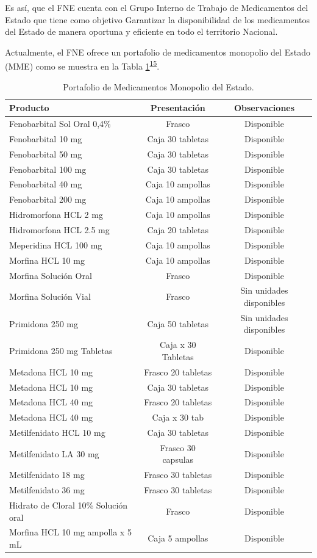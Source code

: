 \documentclass[
]{book}
\begin{document}
Es así, que el FNE cuenta con el Grupo Interno de Trabajo de Medicamentos del Estado que tiene como objetivo Garantizar la disponibilidad de los medicamentos del Estado de manera oportuna y eficiente en todo el territorio Nacional.

Actualmente, el FNE ofrece un portafolio de medicamentos monopolio del Estado (MME) como se muestra en la Tabla \ref{tab:portafolioMME}\textsuperscript{\protect\hyperlink{ref-ColombiaCompraEficiente2021}{15}}.

\begin{table}

\caption{\label{tab:portafolioMME}Portafolio de Medicamentos Monopolio del Estado.}
\centering
\begin{tabular}[t]{lcc}
\toprule
Producto & Presentación & Observaciones\\
\midrule
Fenobarbital Sol Oral 0,4\% & Frasco & Disponible\\
Fenobarbital 10 mg & Caja 30 tabletas & Disponible\\
Fenobarbital 50 mg & Caja 30 tabletas & Disponible\\
Fenobarbital 100 mg & Caja 30 tabletas & Disponible\\
Fenobarbital 40 mg & Caja 10 ampollas & Disponible\\
\addlinespace
Fenobarbital 200 mg & Caja 10 ampollas & Disponible\\
Hidromorfona HCL 2 mg & Caja 10 ampollas & Disponible\\
Hidromorfona HCL 2.5 mg & Caja 20 tabletas & Disponible\\
Meperidina HCL 100 mg & Caja 10 ampollas & Disponible\\
Morfina HCL 10 mg & Caja 10 ampollas & Disponible\\
\addlinespace
Morfina Solución Oral & Frasco & Disponible\\
Morfina Solución Vial & Frasco & Sin unidades disponibles\\
Primidona 250 mg & Caja 50 tabletas & Sin unidades disponibles\\
Primidona 250 mg Tabletas & Caja x 30 Tabletas & Disponible\\
Metadona HCL 10 mg & Frasco 20 tabletas & Disponible\\
\addlinespace
Metadona HCL 10 mg & Caja 30 tabletas & Disponible\\
Metadona HCL 40 mg & Frasco 20 tabletas & Disponible\\
Metadona HCL 40 mg & Caja x 30 tab & Disponible\\
Metilfenidato HCL 10 mg & Caja 30 tabletas & Disponible\\
Metilfenidato LA 30 mg & Frasco 30 capsulas & Disponible\\
\addlinespace
Metilfenidato 18 mg & Frasco 30 tabletas & Disponible\\
Metilfenidato 36 mg & Frasco 30 tabletas & Disponible\\
Hidrato de Cloral 10\% Solución oral & Frasco & Disponible\\
Morfina HCL 10 mg ampolla x 5 mL & Caja 5 ampollas & Disponible\\
\bottomrule
\end{tabular}
\end{table}
\end{document}
